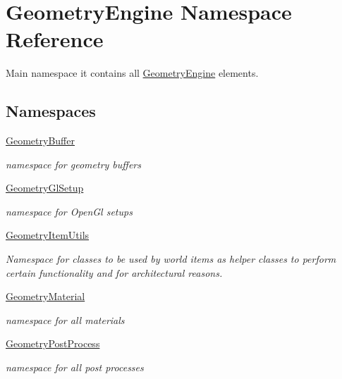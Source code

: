 \hypertarget{namespace_geometry_engine}{}\section{Geometry\+Engine Namespace Reference}
\label{namespace_geometry_engine}


Main namespace it contains all \mbox{\hyperlink{namespace_geometry_engine}{Geometry\+Engine}} elements.  


\subsection*{Namespaces}
\begin{DoxyCompactItemize}
\item 
 \mbox{\hyperlink{namespace_geometry_engine_1_1_geometry_buffer}{Geometry\+Buffer}}
\begin{DoxyCompactList}\small\item\em namespace for geometry buffers \end{DoxyCompactList}\item 
 \mbox{\hyperlink{namespace_geometry_engine_1_1_geometry_gl_setup}{Geometry\+Gl\+Setup}}
\begin{DoxyCompactList}\small\item\em namespace for Open\+Gl setups \end{DoxyCompactList}\item 
 \mbox{\hyperlink{namespace_geometry_engine_1_1_geometry_item_utils}{Geometry\+Item\+Utils}}
\begin{DoxyCompactList}\small\item\em Namespace for classes to be used by world items as helper classes to perform certain functionality and for architectural reasons. \end{DoxyCompactList}\item 
 \mbox{\hyperlink{namespace_geometry_engine_1_1_geometry_material}{Geometry\+Material}}
\begin{DoxyCompactList}\small\item\em namespace for all materials \end{DoxyCompactList}\item 
 \mbox{\hyperlink{namespace_geometry_engine_1_1_geometry_post_process}{Geometry\+Post\+Process}}
\begin{DoxyCompactList}\small\item\em namespace for all post processes \end{DoxyCompactList}\item 

\end{DoxyCompactItemize}

